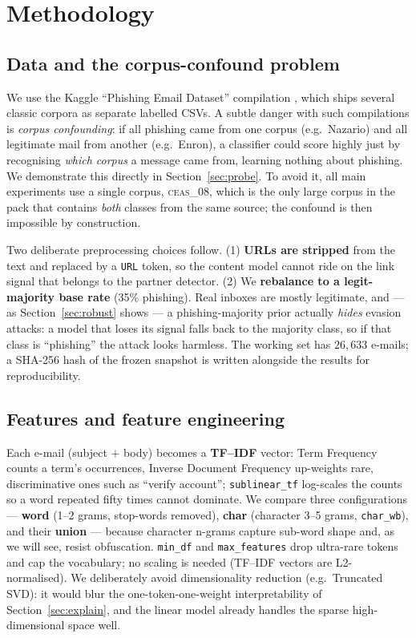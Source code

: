 \documentclass[11pt]{article}
\begin{document}
\section{Methodology}
\label{sec:method}

\subsection{Data and the corpus-confound problem}
We use the Kaggle ``Phishing Email Dataset'' compilation \citep{alam2023phishing},
which ships several classic corpora as separate labelled CSVs. A subtle danger with
such compilations is \emph{corpus confounding}: if all phishing came from one corpus
(e.g.\ Nazario) and all legitimate mail from another (e.g.\ Enron), a classifier
could score highly just by recognising \emph{which corpus} a message came from,
learning nothing about phishing. We demonstrate this directly in
Section~\ref{sec:probe}. To avoid it, all main experiments use a single corpus,
\textsc{ceas\_08}, which is the only large corpus in the pack that contains
\emph{both} classes from the same source; the confound is then impossible by
construction.

Two deliberate preprocessing choices follow. (1) \textbf{URLs are stripped} from the
text and replaced by a \texttt{URL} token, so the content model cannot ride on the
link signal that belongs to the partner detector. (2) We \textbf{rebalance to a
legit-majority base rate} (35\% phishing). Real inboxes are mostly legitimate, and
--- as Section~\ref{sec:robust} shows --- a phishing-majority prior actually
\emph{hides} evasion attacks: a model that loses its signal falls back to the
majority class, so if that class is ``phishing'' the attack looks harmless. The
working set has $26{,}633$ e-mails; a SHA-256 hash of the frozen snapshot is written
alongside the results for reproducibility.

\subsection{Features and feature engineering}
\label{sec:featureng}
Each e-mail (subject $+$ body) becomes a \textbf{TF--IDF} vector: Term Frequency counts a
term's occurrences, Inverse Document Frequency up-weights rare, discriminative ones such as
``verify account''; \texttt{sublinear\_tf} log-scales the counts so a word repeated fifty
times cannot dominate. We compare three configurations --- \textbf{word} (1--2 grams,
stop-words removed), \textbf{char} (character 3--5 grams, \texttt{char\_wb}), and their
\textbf{union} --- because character n-grams capture sub-word shape and, as we will see,
resist obfuscation. \texttt{min\_df} and \texttt{max\_features} drop ultra-rare tokens and
cap the vocabulary; no scaling is needed (TF--IDF vectors are L2-normalised). We deliberately
avoid dimensionality reduction (e.g.\ Truncated SVD): it would blur the one-token-one-weight
interpretability of Section~\ref{sec:explain}, and the linear model already handles the sparse
high-dimensional space well.
\end{document}
